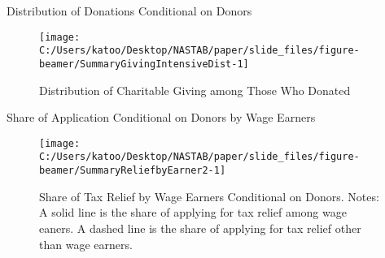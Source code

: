\documentclass[
  ignorenonframetext,
  aspectratio=169,
]{beamer}
\begin{document}
\begin{frame}{Distribution of Donations Conditional on Donors}
\protect\hypertarget{distribution-of-donations-conditional-on-donors}{}
\begin{figure}[t]

{\centering \texttt{[image: C:/Users/katoo/Desktop/NASTAB/paper/slide\_files/figure-beamer/SummaryGivingIntensiveDist-1]} 

}

\caption{Distribution of Charitable Giving among Those Who Donated}\label{fig:SummaryGivingIntensiveDist}
\end{figure}
\end{frame}

\begin{frame}{Share of Application Conditional on Donors by Wage Earners}
\protect\hypertarget{share-of-application-conditional-on-donors-by-wage-earners}{}
\begin{figure}[t]

{\centering \texttt{[image: C:/Users/katoo/Desktop/NASTAB/paper/slide\_files/figure-beamer/SummaryReliefbyEarner2-1]} 

}

\caption{Share of Tax Relief by Wage Earners Conditional on Donors. Notes: A solid line is the share of applying for tax relief among wage eaners. A dashed line is the share of applying for tax relief other than wage earners.}\label{fig:SummaryReliefbyEarner2}
\end{figure}
\end{frame}
\end{document}
